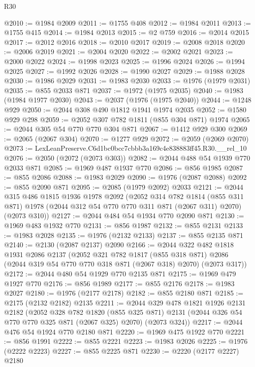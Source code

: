 \begin{lexlean}{R30}
\begin{coremodule}
@2010 := @1984 @2009
@2011 := @1755 @408
@2012 := @1984 @2011
@2013 := @1755 @415
@2014 := @1984 @2013
@2015 := @2 @759
@2016 := @2014 @2015
@2017 := @2012 @2016
@2018 := @2010 @2017
@2019 := @2008 @2018
@2020 := @2006 @2019
@2021 := @2004 @2020
@2022 := @2002 @2021
@2023 := @2000 @2022
@2024 := @1998 @2023
@2025 := @1996 @2024
@2026 := @1994 @2025
@2027 := @1992 @2026
@2028 := @1990 @2027
@2029 := @1988 @2028
@2030 := @1986 @2029
@2031 := @1983 @2030
@2033 := @1976 (@1979 @2031)
@2035 := @855 @2033 @871
@2037 := @1972 (@1975 @2035)
@2040 := @1983 (@1984 @1977 @2030)
@2043 := @2037 (@1976 (@1975 @2040))
@2044 := @1248 @929
@2050 := @2044 @308 @490 @1812 @1941 @1974 @2035
@2052 := @1580 @929 @298
@2059 := @2052 @307 @782 @1811 (@855 @304 @871) @1974
@2065 := @2044 @305 @54 @770 @770 @304 @871
@2067 := @1412 @929 @300
@2069 := @2065 (@2067 @304)
@2070 := @1277 @929
@2072 := @2059 (@2069 @2070)
@2073 := LexLeanPreserve.C6d1bc0bcc7cbbb3a169c4e838883ff45.R30.__rel_10
@2076 := @2050 (@2072 (@2073 @303))
@2082 := @2044 @488 @54 @1939 @770 @2033 @871
@2085 := @1969 @487 @1937 @770
@2086 := @856 @1985
@2087 := @855 @2086
@2088 := @1983 @2029
@2090 := @1976 (@2087 @2088)
@2092 := @855 @2090 @871
@2095 := @2085 (@1979 @2092) @2033
@2121 := @2044
    @315
    @486
    @1815
    @1936
    @1978
    @2092
    (@2052
      @314
      @782
      @1814
      (@855 @311 @871)
      @1978
      (@2044 @312 @54 @770 @770 @311 @871 (@2067 @311) @2070)
      (@2073 @310))
@2127 := @2044 @484 @54 @1934 @770 @2090 @871
@2130 := @1969 @483 @1932 @770
@2131 := @856 @1987
@2132 := @855 @2131
@2133 := @1983 @2028
@2135 := @1976 (@2132 @2133)
@2137 := @855 @2135 @871
@2140 := @2130 (@2087 @2137) @2090
@2166 := @2044
    @322
    @482
    @1818
    @1931
    @2086
    @2137
    (@2052
      @321
      @782
      @1817
      (@855 @318 @871)
      @2086
      (@2044 @319 @54 @770 @770 @318 @871 (@2067 @318) @2070)
      (@2073 @317))
@2172 := @2044 @480 @54 @1929 @770 @2135 @871
@2175 := @1969 @479 @1927 @770
@2176 := @856 @1989
@2177 := @855 @2176
@2178 := @1983 @2027
@2180 := @1976 (@2177 @2178)
@2182 := @855 @2180 @871
@2185 := @2175 (@2132 @2182) @2135
@2211 := @2044
    @329
    @478
    @1821
    @1926
    @2131
    @2182
    (@2052
      @328
      @782
      @1820
      (@855 @325 @871)
      @2131
      (@2044 @326 @54 @770 @770 @325 @871 (@2067 @325) @2070)
      (@2073 @324))
@2217 := @2044 @476 @54 @1924 @770 @2180 @871
@2220 := @1969 @475 @1922 @770
@2221 := @856 @1991
@2222 := @855 @2221
@2223 := @1983 @2026
@2225 := @1976 (@2222 @2223)
@2227 := @855 @2225 @871
@2230 := @2220 (@2177 @2227) @2180

\end{coremodule}
\end{lexlean}
